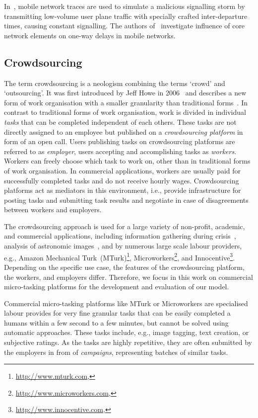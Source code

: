 In~\cite{Lee2007}, mobile network traces are used to simulate a malicious signalling storm by transmitting low-volume user plane traffic with specially crafted inter-departure times, causing constant signalling.
The authors of~\cite{Romirer-Maierhofer2008} investigate influence of core network elements on one-way delays in mobile networks.

\subsection{Crowdsourcing}
The term crowdsourcing is a neologism combining the terms `crowd' and `outsourcing'.
It was first introduced by Jeff Howe in 2006~\cite{Howe2006} and describes a new form of work organisation with a smaller granularity than traditional forms~\cite{Hossfeld2011c}.
In contrast to traditional forms of work organisation, work is divided in individual \emph{tasks} that can be completed independent of each others. 
These tasks are not directly assigned to an employee but published on a \emph{crowdsourcing platform} in form of an open call.
Users publishing tasks on crowdsourcing platforms are referred to as \emph{employer}, users accepting and accomplishing tasks as \emph{workers}.
Workers can freely choose which task to work on, other than in traditional forms of work organisation.
In commercial applications, workers are usually paid for successfully completed tasks and do not receive hourly wages.
Crowdsourcing platforms act as mediators in this environment, i.e., provide infrastructure for posting tasks and submitting task results and negotiate in case of disagreements between workers and employers.

The crowdsourcing approach is used for a large variety of non-profit, academic, and commercial applications, including information gathering during crisis~\cite{Morrow2011}, analysis of astronomic images~\cite{Raddick2010}, and by numerous large scale labour providers, e.g., Amazon Mechanical Turk~(MTurk)\footnote{\url{http://www.mturk.com}, \accessed}, Microworkers\footnote{\url{http://www.microworkers.com}, \accessed}, and Innocentive\footnote{\url{http://www.innocentive.com}, \accessed}.
Depending on the specific use case, the features of the crowdsourcing platform, the workers, and employers differ.
Therefore, we focus in this work on commercial micro-tasking platforms for the development and evaluation of our model.

Commercial micro-tasking platforms like MTurk or Microworkers are specialised labour provides for very fine granular tasks that can be easily completed a humans within a few second to a few minutes, but cannot be solved using automatic approaches. 
These tasks include, e.g., image tagging, text creation, or subjective ratings.
As the tasks are highly repetitive, they are often submitted by the employers in from of \emph{campaigns}, representing batches of similar tasks.

